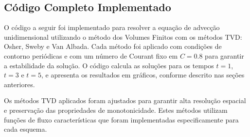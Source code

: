 \subsection{Código Completo Implementado}

O código a seguir foi implementado para resolver a equação de advecção unidimensional utilizando o método dos Volumes Finitos com os métodos TVD: Osher, Sweby e Van Albada. Cada método foi aplicado com condições de contorno periódicas e com um número de Courant fixo em \( C = 0.8 \) para garantir a estabilidade da solução. O código calcula as soluções para os tempos \( t = 1 \), \( t = 3 \) e \( t = 5 \), e apresenta os resultados em gráficos, conforme descrito nas seções anteriores.

Os métodos TVD aplicados foram ajustados para garantir alta resolução espacial e preservação das propriedades de monotonicidade. Estes métodos utilizam funções de fluxo características que foram implementadas especificamente para cada esquema.


